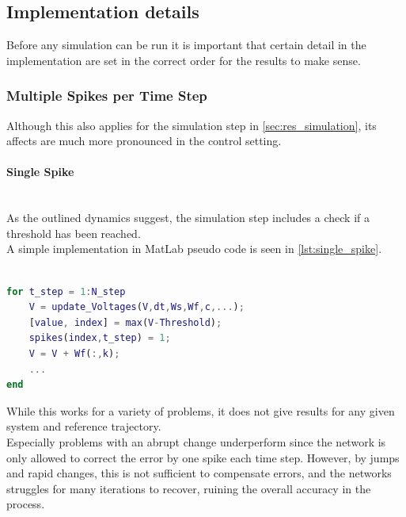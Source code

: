 \subsection{Implementation details}
Before any simulation can be run it is important that certain detail in the implementation are set in the correct order for the results to make sense.

\subsubsection{Multiple Spikes per Time Step}
Although this also applies for the simulation step in \cref{sec:res_simulation}, its affects are much more pronounced in the control setting.\\
\paragraph{Single Spike}\mbox{}\\
As the outlined dynamics suggest, the simulation step includes a check if a threshold has been reached. \\
A simple implementation in MatLab pseudo code is seen in \cref{lst:single_spike}.

\begin{lstlisting}[language=Matlab, caption=Single spike implementation,label=lst:single_spike]

for t_step = 1:N_step
	V = update_Voltages(V,dt,Ws,Wf,c,...);
	[value, index] = max(V-Threshold);
	spikes(index,t_step) = 1;
	V = V + Wf(:,k);
	...
end
\end{lstlisting}
While this works for a variety of problems, it does not give results for any given system and reference trajectory.\\
Especially problems with an abrupt change underperform since the network is only allowed to correct the error by one spike each time step. However, by jumps and rapid changes, this is not sufficient to compensate errors, and the networks struggles for many iterations to recover, ruining the overall accuracy in the process.
